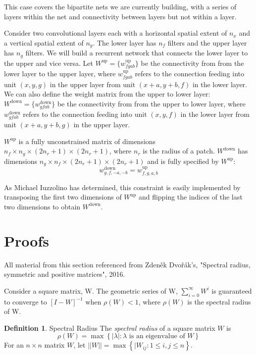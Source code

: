 \documentclass[11pt,letterpaper]{article}
\theoremstyle{definition}
\newtheorem{definition}{Definition}[section]
\begin{document}
This case covers the bipartite nets we are currently building, with
a series of layers within the net and connectivity between layers but
not within a layer.

Consider two convolutional layers each with a horizontal spatial extent
of $n_x$ and a vertical spatial extent of $n_y$.
The lower layer has $n_f$ filters and the upper layer has $n_g$ filters.
We will build a recurrent network that connects the lower layer to the upper
and vice versa.  Let $W^{\mathrm{up}} = \{ w_{fgab}^{\mathrm{up}} \}$ be the 
connectivity from from the lower layer to the upper layer, 
where $w_{fgab}^{\mathrm{up}}$ refers to the connection feeding into
unit $(x,y,g)$ in the upper layer from unit $(x+a,y+b,f)$ in the lower layer.
We can also define the weight matrix from the upper to lower layer:
$W^{\mathrm{down}} = \{ w_{gfab}^{\mathrm{down}} \}$ be the 
connectivity from from the upper to lower layer,
where $w_{gfab}^{\mathrm{down}}$ refers to the connection feeding into
unit $(x,y,f)$ in the lower layer from unit $(x+a,y+b,g)$ in the upper layer.

$W^\mathrm{up}$  is a fully unconstrained matrix of dimensions $n_f \times n_g
\times (2 n_r + 1) \times (2 n_r + 1)$, where $n_r$ is the radius of a patch.
$W^\mathrm{down}$ has dimensions $n_g \times n_f \times (2 n_r + 1) \times (2 n_r +
1)$ and is fully specified by $W^\mathrm{up}$:
\[
w_{g,f,-a,-b}^{\mathrm{down}} = w_{f,g,a,b}^{\mathrm{up}} 
\]

As Michael Iuzzolino has determined, this constraint is easily implemented
by transposing the first two dimensions of $W^\mathrm{up}$ and flipping the
indices of the last two dimensions  to obtain $W^\mathrm{down}$.



%
\small
%

\appendix
\section{Proofs} \label{appendix:proofs}
All material from this section referenced from Zden\v{e}k Dvo\v{r}\'{a}k's, "Spectral radius, symmetric and positive matrices", 2016.

Consider a square matrix, W. The geometric series of W, $\sum_{i=0}^\infty W^i$ is guaranteed to converge to $\left[ I - W\right]^{-1}$ when $\rho(W) < 1$, where $\rho(W)$ is the spectral radius of W.

\theoremstyle{definition}
\begin{definition}{Spectral Radius}
The \textit{spectral radius} of a square matrix $W$ is 
\[
\rho(W) = \max \left\{|\lambda | : \lambda \text{ is an eigenvalue of } W \right\}
\]
For an $n \times n$ matrix $W$, let $||W|| = \max \left\{|W_{ij} : 1 \le i, j \le n \right\}$.
\end{definition}
\end{document}
